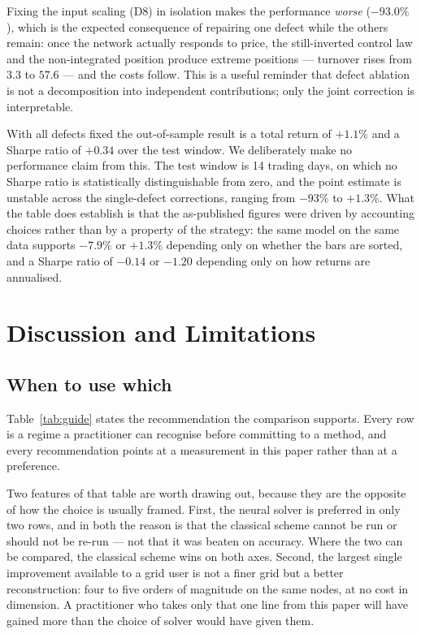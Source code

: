 \documentclass[conference]{IEEEtran}
\begin{document}
Fixing the input scaling (D8) in isolation makes the performance \emph{worse} ($-93.0\%$),
which is the expected consequence of repairing one defect while the others remain: once the
network actually responds to price, the still-inverted control law and the non-integrated
position produce extreme positions --- turnover rises from $3.3$ to $57.6$ --- and the costs
follow. This is a useful reminder that defect ablation is not a decomposition into independent
contributions; only the joint correction is interpretable.

With all defects fixed the out-of-sample result is a total return of $+1.1\%$ and a Sharpe
ratio of $+0.34$ over the test window. We deliberately make no performance claim from this. The
test window is 14 trading days, on which no Sharpe ratio is statistically distinguishable from
zero, and the point estimate is unstable across the single-defect corrections, ranging from
$-93\%$ to $+1.3\%$. What the table does establish is that the as-published figures were driven
by accounting choices rather than by a property of the strategy: the same model on the same data
supports $-7.9\%$ or $+1.3\%$ depending only on whether the bars are sorted, and a Sharpe ratio
of $-0.14$ or $-1.20$ depending only on how returns are annualised.


\section{Discussion and Limitations}\label{sec:disc}

\subsection{When to use which}
Table~\ref{tab:guide} states the recommendation the comparison supports. Every row is a regime a
practitioner can recognise before committing to a method, and every recommendation points at a
measurement in this paper rather than at a preference.



Two features of that table are worth drawing out, because they are the opposite of how the choice
is usually framed. First, the neural solver is preferred in only two rows, and in both the reason
is that the classical scheme cannot be run or should not be re-run --- not that it was beaten on
accuracy. Where the two can be compared, the classical scheme wins on both axes. Second, the
largest single improvement available to a grid user is not a finer grid but a better
reconstruction: four to five orders of magnitude on the same nodes, at no cost in dimension. A
practitioner who takes only that one line from this paper will have gained more than the choice of
solver would have given them.
\end{document}
